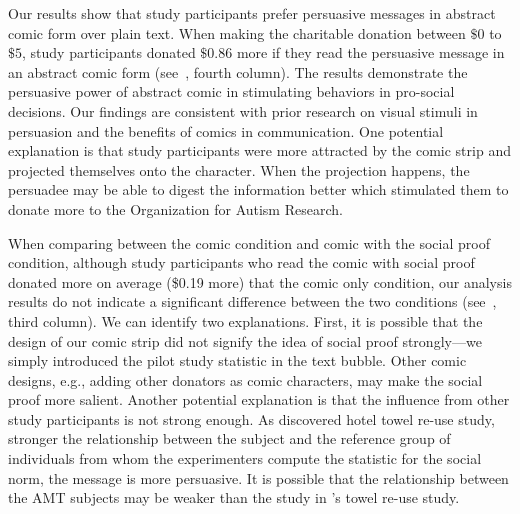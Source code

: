\begin{description} [leftmargin=\parindent,topsep=0pt,partopsep=3pt,parsep=0pt,itemsep=3pt, listparindent=\parindent]
    \item[Comic vs. Plain Text:] Our results show that study participants prefer persuasive messages in abstract comic form over plain text. When making the charitable donation between $\$0$ to $\$5$, study participants donated $\$ 0.86$ more if they read the persuasive message in an abstract comic form (see~, fourth column). The results demonstrate the persuasive power of abstract comic in stimulating behaviors in pro-social decisions. Our findings are consistent with prior research on visual stimuli in persuasion and the benefits of comics in communication. One potential explanation is that study participants were more attracted by the comic strip and projected themselves onto the character. When the projection happens, the persuadee may be able to digest the information better which stimulated them to donate more to the Organization for Autism Research. 
    
    \item[Social Proof Condition:] When comparing between the comic condition and comic with the social proof condition, although study participants who read the comic with social proof donated more on average (\$0.19 more) that the comic only condition, our analysis results do not indicate a significant difference between the two conditions (see~, third column). 
    We can identify two explanations. First, it is possible that the design of our comic strip did not signify the idea of social proof strongly---we simply introduced the pilot study statistic in the text bubble. Other comic designs, e.g., adding other donators as comic characters, may make the social proof more salient. Another potential explanation is that the influence from other study participants is not strong enough. As \textcite{goldstein2008room} discovered hotel towel re-use study, stronger the relationship between the subject and the reference group of individuals from whom the experimenters compute the statistic for the social norm, the message is more persuasive. It is possible that the relationship between the AMT subjects may be weaker than the study in \textcite{goldstein2008room}'s towel re-use study.


\end{description}
